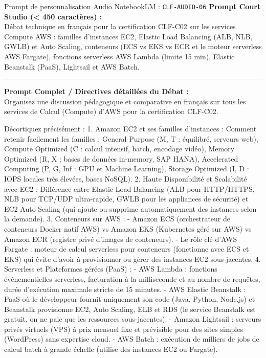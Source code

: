 \documentclass[11pt,a4paper]{article}
\begin{document}
\begin{promptbox}{Prompt de personnalisation Audio NotebookLM : \texttt{CLF-AUDIO-06}}
\textbf{Prompt Court Studio (< 450 caractères) :}\\
Débat technique en français pour la certification CLF-C02 sur les services Compute AWS : familles d'instances EC2, Elastic Load Balancing (ALB, NLB, GWLB) et Auto Scaling, conteneurs (ECS vs EKS vs ECR et le moteur serverless AWS Fargate), fonctions serverless AWS Lambda (limite 15 min), Elastic Beanstalk (PaaS), Lightsail et AWS Batch.

\medskip\hrule\medskip
\textbf{Prompt Complet / Directives détaillées du Débat :}\\
Organisez une discussion pédagogique et comparative en français sur tous les services de Calcul (Compute) d'AWS pour la certification CLF-C02.

Décortiquez précisément :
1. Amazon EC2 et ses familles d'instances :
Comment retenir facilement les familles : General Purpose (M, T : équilibré, serveurs web), Compute Optimized (C : calcul intensif, batch, encodage vidéo), Memory Optimized (R, X : bases de données in-memory, SAP HANA), Accelerated Computing (P, G, Inf : GPU et Machine Learning), Storage Optimized (I, D : IOPS locales très élevées, bases NoSQL).
2. Haute Disponibilité et Scalabilité avec EC2 :
Différence entre Elastic Load Balancing (ALB pour HTTP/HTTPS, NLB pour TCP/UDP ultra-rapide, GWLB pour les appliances de sécurité) et EC2 Auto Scaling (qui ajoute ou supprime automatiquement des instances selon la demande).
3. Conteneurs sur AWS :
- Amazon ECS (orchestrateur de conteneurs Docker natif AWS) vs Amazon EKS (Kubernetes géré sur AWS) vs Amazon ECR (registre privé d'images de conteneurs).
- Le rôle clé d'AWS Fargate : moteur de calcul serverless pour conteneurs (fonctionne avec ECS et EKS) qui évite d'avoir à provisionner ou gérer des instances EC2 sous-jacentes.
4. Serverless et Plateformes gérées (PaaS) :
- AWS Lambda : fonctions événementielles serverless, facturation à la milliseconde et au nombre de requêtes, durée d'exécution maximale stricte de 15 minutes.
- AWS Elastic Beanstalk : PaaS où le développeur fournit uniquement son code (Java, Python, Node.js) et Beanstalk provisionne EC2, Auto Scaling, ELB et RDS (le service Beanstalk est gratuit, on ne paie que les ressources sous-jacentes).
- Amazon Lightsail : serveurs privés virtuels (VPS) à prix mensuel fixe et prévisible pour des sites simples (WordPress) sans expertise cloud.
- AWS Batch : exécution de milliers de jobs de calcul batch à grande échelle (utilise des instances EC2 ou Fargate).
\end{promptbox}
\end{document}
